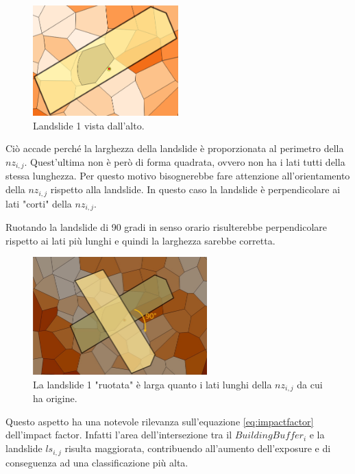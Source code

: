 \begin{figure}[h]
	\centering
	\includegraphics[width=0.5\textwidth]{images/WrongPerimeter}
	\caption{Landslide 1 vista dall'alto. }
	\label{wrongperimeter}
\end{figure}

Ciò accade perché la larghezza della landslide è proporzionata al perimetro della $nz_{i,j}$. Quest'ultima non è però di forma quadrata, ovvero non ha i lati tutti della stessa lunghezza. Per questo motivo bisognerebbe fare attenzione all'orientamento della $nz_{i,j}$ rispetto alla landslide. In questo caso la landslide è  perpendicolare ai lati "corti" della $nz_{i,j}$. 

Ruotando la landslide di 90 gradi in senso orario risulterebbe perpendicolare rispetto ai lati più lunghi e quindi la larghezza sarebbe corretta.

\begin{figure}[h]
	\centering
	\includegraphics[width=0.6\textwidth]{images/LandslideRotation}
	\caption{La landslide 1 "ruotata" è larga quanto i lati lunghi della $nz_{i,j}$ da cui ha origine.}
	\label{landsliderotation}
\end{figure}


Questo aspetto ha una notevole rilevanza sull'equazione \ref{eq:impactfactor} dell'impact factor. Infatti l'area dell'intersezione tra il $BuildingBuffer_i$ e la landslide $ls_{i,j}$ risulta maggiorata, contribuendo all'aumento dell'exposure e di conseguenza ad una classificazione più alta.



